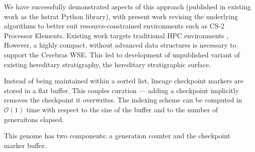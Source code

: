 We have successfully demonstrated aspects of this approach (published in existing work as the hstrat Python library), with present work revising the underlying algorithms to better suit resource-constrained environments such as CS-2 Processor Elements.
Existing work targets traditional HPC environments \citep{moreno2022hstrat},
However, a highly compact, without advanced data structures is necessary to support the Cerebras WSE.
This led to development of unpublished variant of existing hereditary stratigraphy, the hereditary stratigraphic surface.



Instead of being maintained within a sorted list, lineage checkpoint markers are stored in a flat buffer.
This couples curation --- adding a checkpoint implicitly removes the checkpoint it overwrites.
The indexing scheme can be computed in $\mathcal{O(1)}$ time with respect to the size of the buffer and to the number of generaitons elapsed.

This genome has two components: a generation counter and the checkpoint marker buffer.
